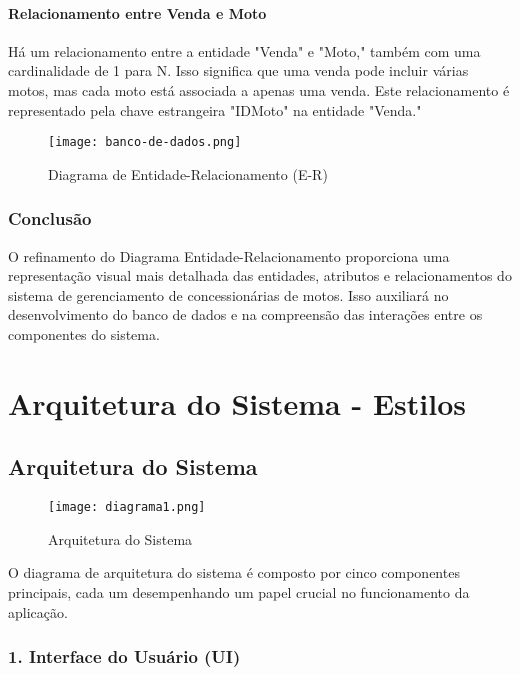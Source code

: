 \paragraph{Relacionamento entre Venda e Moto}

Há um relacionamento entre a entidade "Venda" e "Moto," também com uma cardinalidade de 1 para N. Isso significa que uma venda pode incluir várias motos, mas cada moto está associada a apenas uma venda. Este relacionamento é representado pela chave estrangeira "IDMoto" na entidade "Venda."

\begin{figure}[h]
	\centering
	\texttt{[image: banco-de-dados.png]}
	\caption{Diagrama de Entidade-Relacionamento (E-R)}
	\label{fig:Diagrama de Banco de Dados}
\end{figure}

\subsubsection{Conclusão}

O refinamento do Diagrama Entidade-Relacionamento proporciona uma representação visual mais detalhada das entidades, atributos e relacionamentos do sistema de gerenciamento de concessionárias de motos. Isso auxiliará no desenvolvimento do banco de dados e na compreensão das interações entre os componentes do sistema.


\section{Arquitetura do Sistema - Estilos}


    \subsection{Arquitetura do Sistema}

\begin{figure}[h]
	\centering
	\texttt{[image: diagrama1.png]}
	\caption{Arquitetura do Sistema}
	\label{fig:diagrama1}
\end{figure}

	O diagrama de arquitetura do sistema é composto por cinco componentes principais, cada um desempenhando um papel crucial no funcionamento da aplicação.
	
	\subsubsection*{1. Interface do Usuário (UI)}
	
